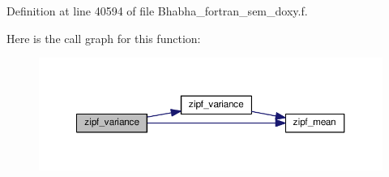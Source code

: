 Definition at line 40594 of file Bhabha\+\_\+fortran\+\_\+sem\+\_\+doxy.\+f.



Here is the call graph for this function\+:\nopagebreak
\begin{figure}[H]
\begin{center}
\leavevmode
\includegraphics[width=350pt]{_bhabha__fortran__sem__doxy_8f_aaa5f46761caed5c5998401d0fbc17c58_cgraph}
\end{center}
\end{figure}


